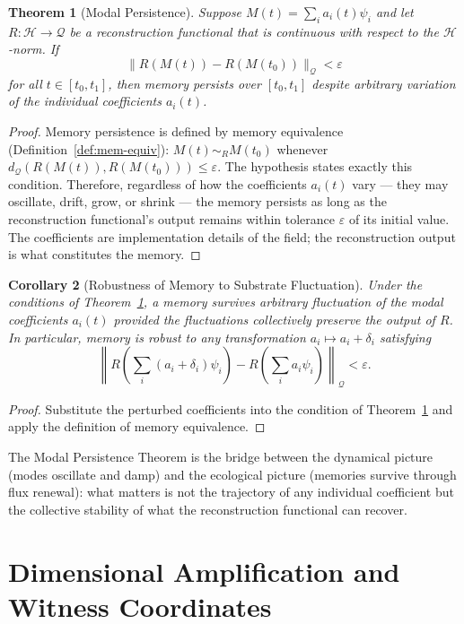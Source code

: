 \documentclass[12pt, oneside]{book}
\theoremstyle{plain}
\newtheorem{theorem}{Theorem}[chapter]
\newtheorem{corollary}[theorem]{Corollary}
\theoremstyle{definition}
\theoremstyle{remark}
\newcommand{\calH}{\mathcal{H}}
\newcommand{\calQ}{\mathcal{Q}}
\begin{document}
\begin{theorem}[Modal Persistence]
\label{thm:modal-persistence}
Suppose $M(t) = \sum_i a_i(t)\psi_i$ and let
$R : \calH \to \calQ$ be a reconstruction functional
that is continuous with respect to the $\calH$-norm.
If
\[
  \|R(M(t)) - R(M(t_0))\|_{\calQ} < \varepsilon
\]
for all $t \in [t_0, t_1]$, then memory persists over
$[t_0, t_1]$ despite arbitrary variation of the
individual coefficients $a_i(t)$.
\end{theorem}

\begin{proof}
Memory persistence is defined by memory equivalence
(Definition~\ref{def:mem-equiv}): $M(t) \sim_R M(t_0)$
whenever $d_{\calQ}(R(M(t)), R(M(t_0))) \leq \varepsilon$.
The hypothesis states exactly this condition.
Therefore, regardless of how the coefficients $a_i(t)$
vary --- they may oscillate, drift, grow, or shrink ---
the memory persists as long as the reconstruction
functional's output remains within tolerance $\varepsilon$
of its initial value.
The coefficients are implementation details of the field;
the reconstruction output is what constitutes the memory.
\end{proof}

\begin{corollary}[Robustness of Memory to Substrate Fluctuation]
Under the conditions of Theorem~\ref{thm:modal-persistence},
a memory survives arbitrary fluctuation of the modal
coefficients $a_i(t)$ provided the fluctuations collectively
preserve the output of $R$.
In particular, memory is robust to any transformation
$a_i \mapsto a_i + \delta_i$ satisfying
\[
  \left\|R\!\left(\sum_i (a_i + \delta_i)\psi_i\right)
        - R\!\left(\sum_i a_i\psi_i\right)\right\|_{\calQ}
  < \varepsilon.
\]
\end{corollary}

\begin{proof}
Substitute the perturbed coefficients into the condition
of Theorem~\ref{thm:modal-persistence} and apply the
definition of memory equivalence.
\end{proof}

The Modal Persistence Theorem is the bridge between the
dynamical picture (modes oscillate and damp) and the
ecological picture (memories survive through flux renewal):
what matters is not the trajectory of any individual
coefficient but the collective stability of what the
reconstruction functional can recover.

\chapter{Dimensional Amplification and Witness Coordinates}
\end{document}
